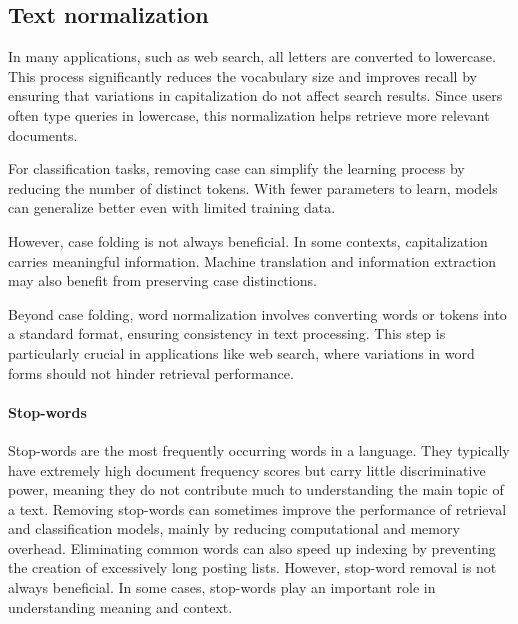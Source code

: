 \subsection{Text normalization}
In many applications, such as web search, all letters are converted to lowercase. 
This process significantly reduces the vocabulary size and improves recall by ensuring that variations in capitalization do not affect search results. 
Since users often type queries in lowercase, this normalization helps retrieve more relevant documents.

For classification tasks, removing case can simplify the learning process by reducing the number of distinct tokens. 
With fewer parameters to learn, models can generalize better even with limited training data.

However, case folding is not always beneficial. 
In some contexts, capitalization carries meaningful information.
Machine translation and information extraction may also benefit from preserving case distinctions.

Beyond case folding, word normalization involves converting words or tokens into a standard format, ensuring consistency in text processing. 
This step is particularly crucial in applications like web search, where variations in word forms should not hinder retrieval performance. 

\paragraph*{Stop-words}
Stop-words are the most frequently occurring words in a language. 
They typically have extremely high document frequency scores but carry little discriminative power, meaning they do not contribute much to understanding the main topic of a text.
Removing stop-words can sometimes improve the performance of retrieval and classification models, mainly by reducing computational and memory overhead. 
Eliminating common words can also speed up indexing by preventing the creation of excessively long posting lists.
However, stop-word removal is not always beneficial. 
In some cases, stop-words play an important role in understanding meaning and context.

